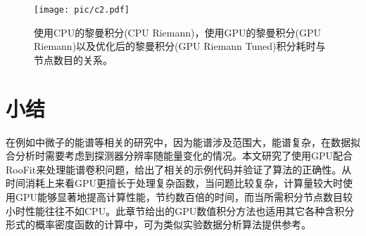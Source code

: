 \begin{figure}
    \centering
    \texttt{[image: pic/c2.pdf]}
    \caption{ 使用CPU的黎曼积分(CPU Riemann)，使用GPU的黎曼积分(GPU Riemann)以及优化后的黎曼积分(GPU Riemann Tuned)积分耗时与节点数目的关系。}
    \label{fig:cuda_3}
\end{figure}

\section{小结}

在例如中微子的能谱等相关的研究中，因为能谱涉及范围大，能谱复杂，在数据拟合分析时需要考虑到探测器分辨率随能量变化的情况。本文研究了使用GPU配合RooFit来处理能谱卷积问题，给出了相关的示例代码并验证了算法的正确性。从时间消耗上来看GPU更擅长于处理复杂函数，当问题比较复杂，计算量较大时使用GPU能够显著地提高计算性能，节约数百倍的时间，而当所需积分节点数目较小时性能往往不如CPU。此章节给出的GPU数值积分方法也适用其它各种含积分形式的概率密度函数的计算中，可为类似实验数据分析算法提供参考。